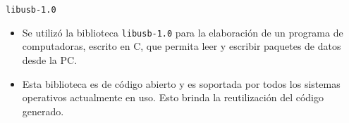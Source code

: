 \begin{frame}{\texttt{libusb-1.0}}
	\begin{itemize}
		\item Se utilizó la biblioteca \texttt{libusb-1.0} para la elaboración de un programa de computadoras, escrito en C, que permita leer y escribir paquetes de datos desde la PC.
		\item Esta biblioteca es de código abierto y es soportada por todos los sistemas operativos actualmente en uso. Esto brinda la reutilización del código generado.
	\end{itemize}
\end{frame}
